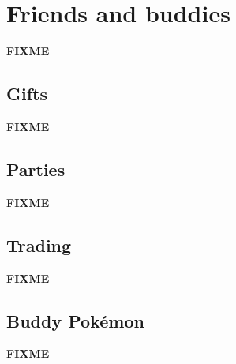 \chapter{Friends and buddies}
\label{chap:friends}
\textbf{FIXME}

\section{Gifts}
\label{sec:gifts}
\textbf{FIXME}

\section{Parties}
\label{sec:parties}
\textbf{FIXME}

\section{Trading}
\label{sec:trades}
\textbf{FIXME}

\section{Buddy Pokémon}
\label{sec:buddies}
\textbf{FIXME}

